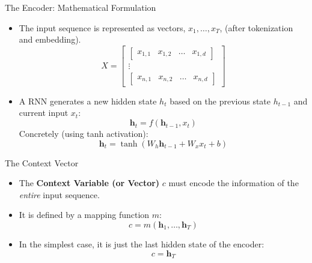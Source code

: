 \documentclass[aspectratio=169]{beamer}
\begin{document}
\begin{frame}{The Encoder: Mathematical Formulation}
	\begin{itemize}
		\item 	The input sequence is represented as vectors, $x_1, \dots, x_T$, (after tokenization and embedding).
		\begin{equation}
			X = \begin{bmatrix}
				\begin{bmatrix} x_{1,1} & x_{1,2} & \dots & x_{1,d} \end{bmatrix} \\				\vdots \\
				\begin{bmatrix} x_{n,1} & x_{n,2} & \dots & x_{n,d} \end{bmatrix}
			\end{bmatrix}
		\end{equation}
		\item A RNN generates a new hidden state $h_t$ based on the previous state $h_{t-1}$ and current input $x_t$:
		\begin{equation}
			\mathbf{h}_t = f(\mathbf{h}_{t-1}, x_t)
		\end{equation}
		Concretely (using tanh activation):
		\begin{equation}
			\mathbf{h}_t = \tanh(W_{h}\mathbf{h}_{t-1} + W_{x}x_t + b)
		\end{equation}
	\end{itemize}
\end{frame}


\begin{frame}{The Context Vector}
	\begin{itemize}
		\item The \textbf{Context Variable (or Vector)} $c$ must encode the information of the \textit{entire} input sequence.
		\item It is defined by a mapping function $m$:
		\begin{equation}
			c = m(\mathbf{h}_1, \dots, \mathbf{h}_T)
		\end{equation}
		\item In the simplest case, it is just the last hidden state of the encoder:
		\begin{equation}
			c = \mathbf{h}_T
		\end{equation}
	\end{itemize}
\end{frame}
\end{document}
